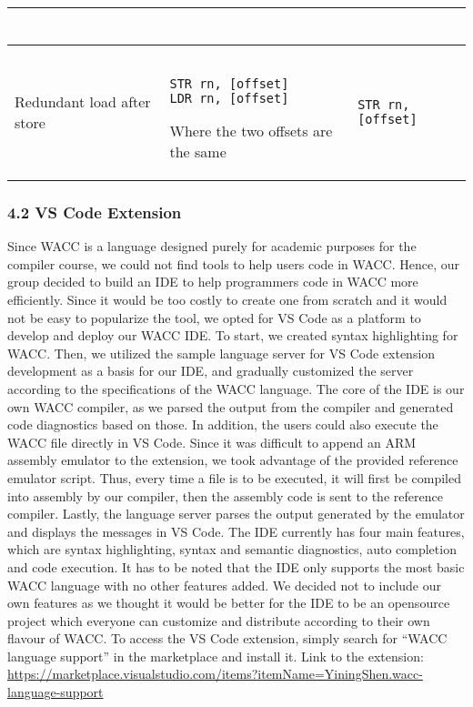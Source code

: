 \documentclass[10pt,a4paper]{report}
\newenvironment{tabularverbatim}
 {\VerbatimEnvironment
  \begin{BVerbatim}[baseline=c,formatcom=\setlength{\baselineskip}{\normalbaselineskip}]}
 {\end{BVerbatim}}
\begin{document}
\begin{center}
\begin{tabular}{| m{3cm} | m{4cm} | m{4cm} |}
\begin{tabularverbatim}
      \end{tabularverbatim}
      \\
      \hline
      Redundant load after store &
      \begin{tabularverbatim}

STR rn, [offset]
LDR rn, [offset]

      \end{tabularverbatim}
      \newline
      Where the two offsets are the same
      &
      \begin{tabularverbatim}
STR rn, [offset]
      \end{tabularverbatim}
      \\
      \hline
    \end{tabular}
  \end{center}


  \subsubsection*{4.2 VS Code Extension}
  Since WACC is a language designed purely for academic purposes for the
  compiler course, we could not find tools to help users code in WACC. Hence,
  our group decided to build an IDE to help programmers code in WACC more
  efficiently. Since it would be too costly to create one from scratch and it
  would not be easy to popularize the tool, we opted for VS Code as a platform 
  to develop and deploy our WACC IDE. To start, we created syntax highlighting
  for WACC. Then, we utilized the sample language server for VS Code extension
  development as a basis for our IDE, and gradually customized the server
  according to the specifications of the WACC language. The core of the IDE is
  our own WACC compiler, as we parsed the output from the compiler and generated
  code diagnostics based on those. In addition, the users could also execute the
  WACC file directly in VS Code. Since it was difficult to append an ARM
  assembly emulator to the extension, we took advantage of the provided
  reference emulator script. Thus, every time a file is to be executed, it will
  first be compiled into assembly by our compiler, then the assembly code is
  sent to the reference compiler. Lastly, the language server parses the output
  generated by the emulator and displays the messages in VS Code. The IDE
  currently has four main features, which are syntax highlighting, syntax and
  semantic diagnostics, auto completion and code execution. It has to be noted
  that the IDE only supports the most basic WACC language with no other features
  added. We decided not to include our own features as we thought it would be
  better for the IDE to be an opensource project which everyone can customize
  and distribute according to their own flavour of WACC. To access the VS Code
  extension, simply search for “WACC language support” in the marketplace and
  install it.
  Link to the extension: 
  \url{https://marketplace.visualstudio.com/items?itemName=YiningShen.wacc-language-support}
\end{document}
